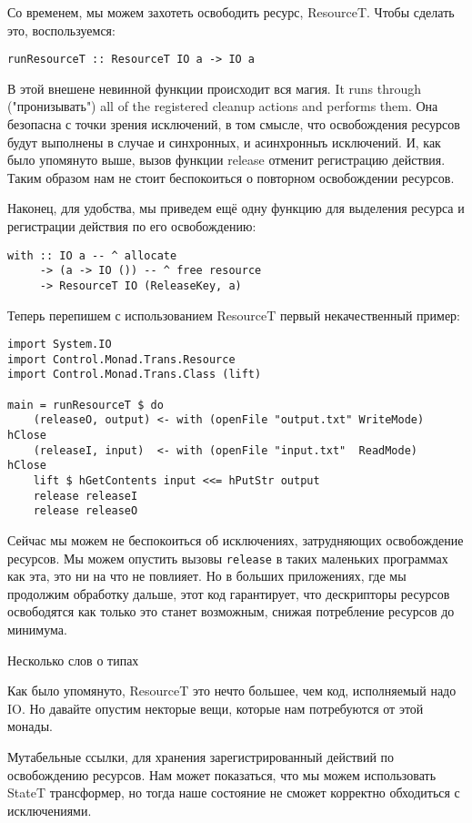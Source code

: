 Со временем, мы можем захотеть освободить ресурс, ResourceT. Чтобы сделать это,
воспользуемся:
\begin{lstlisting}
runResourceT :: ResourceT IO a -> IO a
\end{lstlisting}
В этой внешене невинной функции происходит вся магия. 
 It runs through ("пронизывать") all of
the
registered cleanup actions and performs them. Она безопасна с точки зрения исключений, в
том смысле, что освобождения ресурсов будут выполнены в случае и синхронных, и
асинхронныъ исключений. И, как было упомянуто выше, вызов функции release отменит
регистрацию действия. Таким образом нам не стоит беспокоиться о повторном освобождении
ресурсов.

Наконец, для удобства, мы приведем ещё одну функцию для выделения ресурса и регистрации
действия по его освобождению:
\begin{lstlisting}
with :: IO a -- ^ allocate
     -> (a -> IO ()) -- ^ free resource
     -> ResourceT IO (ReleaseKey, a)
\end{lstlisting}

Теперь перепишем с использованием ResourceT первый некачественный пример:
\begin{lstlisting}
import System.IO
import Control.Monad.Trans.Resource
import Control.Monad.Trans.Class (lift)

main = runResourceT $ do
    (releaseO, output) <- with (openFile "output.txt" WriteMode) hClose
    (releaseI, input)  <- with (openFile "input.txt"  ReadMode)  hClose
    lift $ hGetContents input <<= hPutStr output
    release releaseI
    release releaseO
\end{lstlisting}

Сейчас мы можем не беспокоиться об исключениях, затрудняющих освобождение ресурсов. Мы
можем опустить вызовы \verb=release= в таких маленьких программах как эта, это ни на что
не повлияет. Но в больших приложениях, где мы продолжим обработку дальше, этот код
гарантирует, что дескрипторы ресурсов освободятся как только это станет возможным, снижая
потребление ресурсов до минимума.

Несколько слов о типах

Как было упомянуто, ResourceT это нечто большее, чем код, исполняемый надо IO. Но давайте
опустим некторые вещи, которые нам потребуются от этой монады.

Мутабельные ссылки, для хранения зарегистрированный действий по освобождению ресурсов.
Нам может показаться, что мы можем использовать StateT трансформер, но тогда наше
состояние не сможет корректно обходиться с исключениями.


